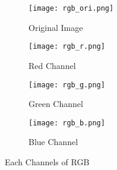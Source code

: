 \documentclass[12pt]{report}
\begin{document}
\begin{tableofcontents}
        	\begin{figure}[ht]
				\centering
				\begin{subfigure}{0.24\textwidth}
					\texttt{[image: rgb\_ori.png]}
					\caption{Original Image}
				\end{subfigure}
				\begin{subfigure}{0.24\textwidth}
					\texttt{[image: rgb\_r.png]}
					\caption{Red Channel}
				\end{subfigure}
				\begin{subfigure}{0.24\textwidth}
					\texttt{[image: rgb\_g.png]}
					\caption{Green Channel}
				\end{subfigure}
				\begin{subfigure}{0.24\textwidth}
					\texttt{[image: rgb\_b.png]}
					\caption{Blue Channel}
				\end{subfigure}
				\caption{Each Channels of RGB}
			\end{figure}

\end{tableofcontents}
\end{document}
